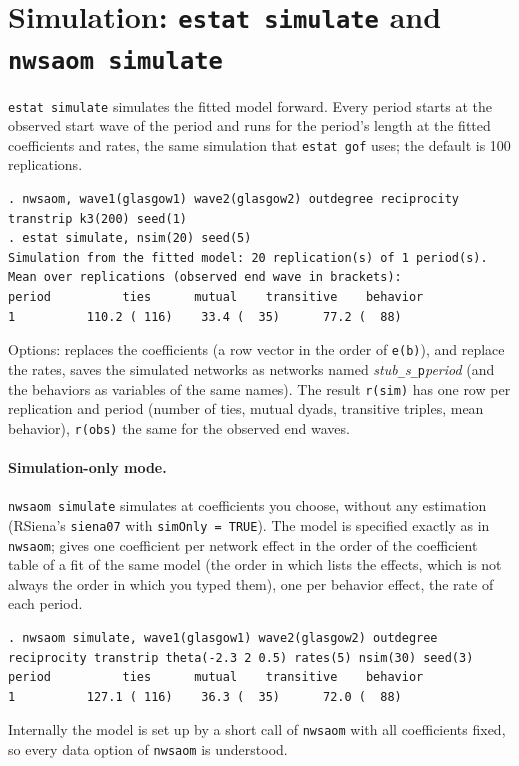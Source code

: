 \section{Simulation: \texttt{estat simulate} and \texttt{nwsaom simulate}}\label{sec:sim}

\texttt{estat simulate} simulates the fitted model forward. Every period starts at the observed start wave of the period and runs for the period's length at the fitted coefficients and rates, the same simulation that \texttt{estat gof} uses; the default is 100 replications.
\begin{lstlisting}
. nwsaom, wave1(glasgow1) wave2(glasgow2) outdegree reciprocity transtrip k3(200) seed(1)
. estat simulate, nsim(20) seed(5)
Simulation from the fitted model: 20 replication(s) of 1 period(s).
Mean over replications (observed end wave in brackets):
period          ties      mutual    transitive    behavior
1          110.2 ( 116)    33.4 (  35)      77.2 (  88)
\end{lstlisting}
Options:  replaces the coefficients (a row vector in the order of \texttt{e(b)}),  and  replace the rates,  saves the simulated networks as networks named \emph{stub}\texttt{\_}\emph{s}\texttt{\_p}\emph{period} (and the behaviors as variables of the same names). The result \texttt{r(sim)} has one row per replication and period (number of ties, mutual dyads, transitive triples, mean behavior), \texttt{r(obs)} the same for the observed end waves.

\paragraph{Simulation-only mode.} \texttt{nwsaom simulate} simulates at coefficients you choose, without any estimation (RSiena's \texttt{siena07} with \texttt{simOnly = TRUE}). The model is specified exactly as in \texttt{nwsaom};  gives one coefficient per network effect in the order of the coefficient table of a fit of the same model (the order in which \nwsaom{} lists the effects, which is not always the order in which you typed them),  one per behavior effect,  the rate of each period.
\begin{lstlisting}
. nwsaom simulate, wave1(glasgow1) wave2(glasgow2) outdegree reciprocity transtrip theta(-2.3 2 0.5) rates(5) nsim(30) seed(3)
period          ties      mutual    transitive    behavior
1          127.1 ( 116)    36.3 (  35)      72.0 (  88)
\end{lstlisting}
Internally the model is set up by a short call of \texttt{nwsaom} with all coefficients fixed, so every data option of \texttt{nwsaom} is understood.


